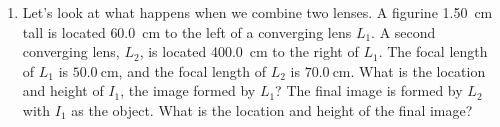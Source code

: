 \documentclass[11pt]{article}
\begin{document}
\begin{enumerate}

%

\newcommand{\oheight}{\SI{1.50}{\cm}}
\newcommand{\odist}{\SI{60.0}{\cm}}
\newcommand{\flenq}{\SI{50.0}{\cm}}
\newcommand{\flenw}{\SI{70.0}{\cm}}
\newcommand{\lensep}{\SI{400.0}{\cm}}
\newcommand{\Lq}{L_1}
\newcommand{\Lw}{L_2}
\newcommand{\Iq}{I_1}
\newcommand{\Iw}{I_2}

\setcounter{enumi}{1}

\item Let's look at what happens when we combine two lenses.  A figurine {\oheight} tall is located {\odist} to the left of a converging lens $\Lq$.  A second converging lens, $\Lw$, is located {\lensep} to the right of $\Lq$.  The focal length of $\Lq$ is $\flenq$, and the focal length of $\Lw$ is $\flenw$.  What is the location and height of $\Iq$, the image formed by $\Lq$?  The final image is formed by $\Lw$ with $\Iq$ as the object.  What is the location and height of the final image?

\end{enumerate}
\end{document}
